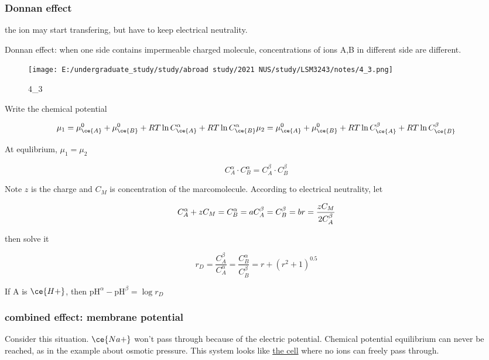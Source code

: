 \documentclass[]{article}
\begin{document}
\hypertarget{donnan-effect}{%
\subsubsection{Donnan effect}\label{donnan-effect}}

the ion may start transfering, but have to keep electrical neutrality.

Donnan effect: when one side contains impermeable charged molecule,
concentrations of ions A,B in different side are different.

\begin{figure}
\centering
\texttt{[image: E:/undergraduate\_study/study/abroad study/2021 NUS/study/LSM3243/notes/4\_3.png]}
\caption{4\_3}
\end{figure}

Write the chemical potential

\[\mu_1=\mu_{\ce{A}}^0+\mu_{\ce{B}}^0+RT\ln C_{\ce{A}}^\alpha+RT\ln C_{\ce{B}}^\alpha\\
\mu_2=\mu_{\ce{A}}^0+\mu_{\ce{B}}^0+RT\ln C_{\ce{A}}^\beta+RT\ln C_{\ce{B}}^\beta\\\]

At equlibrium, \(\mu_1=\mu_2\)

\[C^\alpha_{A}\cdot C^\alpha_{B}=C^\beta_{A}\cdot C^\beta_{B}\]

Note \(z\) is the charge and \(C_M\) is concentration of the
marcomolecule. According to electrical neutrality, let

\[C^\alpha_{A}+zC_M=C^\alpha_{B}=a\\
C^\beta_{A}= C^\beta_{B}=b\\
r=\dfrac{zC_M}{2C^\beta_{A}}\]

then solve it

\[r_D=\dfrac{C^\beta_{A}}{C^\alpha_{A}}=\dfrac{C^\alpha_{B}}{C^\beta_{B}}=r+\left(r^2+1\right)^{0.5}\]

If A is \(\ce{H+}\), then
\(\mathrm{pH}^\alpha-\mathrm{pH}^\beta=\log r_D\)

\hypertarget{combined-effect-membrane-potential}{%
\subsubsection{combined effect: membrane
potential}\label{combined-effect-membrane-potential}}

Consider this situation. \(\ce{Na+}\) won't pass through because of the
electric potential. Chemical potential equilibrium can never be reached,
as in the example about osmotic pressure. This system looks like
\underline{the cell} where no ions can freely pass through.
\end{document}
